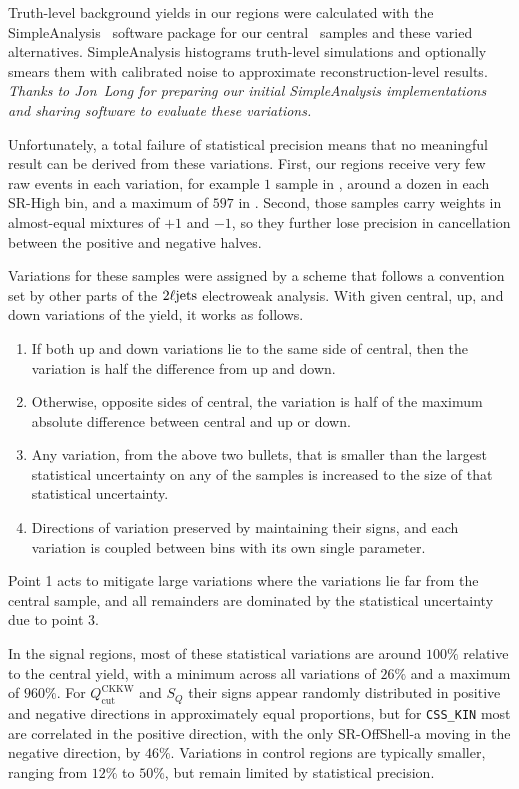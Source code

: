 Truth-level background yields in our regions were calculated with the
SimpleAnalysis~\cite{Lorenz:2752450,simpleanalysis_cern}
software package for
our central \diboson\ samples and these varied alternatives.
SimpleAnalysis histograms truth-level simulations and optionally smears them
with calibrated noise to approximate reconstruction-level results.
\emph{Thanks to Jon~Long for preparing our initial
SimpleAnalysis implementations and sharing software to evaluate these
variations.}

Unfortunately, a total failure of statistical precision means that no
meaningful result can be derived from these variations.
First, our regions receive very few raw events in each variation,
for example $1$ sample in \srllbb, around a dozen in
each SR-High bin, and a maximum of $597$ in \crvz.
Second, those samples carry weights in almost-equal mixtures of $+1$ and $-1$,
so they further lose precision in cancellation between the positive and
negative halves.

Variations for these samples were assigned by a scheme that follows a
convention set by other parts of the $2\ell\mathrm{jets}$ electroweak analysis.
With given central, up, and down variations of the yield, it works as
follows.
\begin{enumerate}
\item If both up and down variations lie to the same side of central, then
the variation is half the difference from up and down.
\item Otherwise, opposite sides of central, the variation is half of the
maximum absolute difference between central and up or down.
\item Any variation, from the above two bullets, that is smaller than the
largest statistical uncertainty on any of the samples is increased to the size
of that statistical uncertainty.
\item Directions of variation preserved by maintaining their signs, and
each variation is coupled between bins with its own single parameter.
\end{enumerate}
Point 1 acts to mitigate large variations where the variations lie far from
the central sample,
and all remainders are dominated by the statistical uncertainty due to point 3.

In the signal regions, most of these statistical variations are around
$100\%$ relative to the central yield, with a minimum across all variations
of $26\%$ and a maximum of $960\%$.
For $Q_\textrm{cut}^\textrm{CKKW}$ and $S_Q$ their signs appear randomly
distributed in positive and negative directions in approximately equal
proportions, but for \texttt{CSS\_KIN} most are correlated in the positive
direction, with the only SR-OffShell-a moving in the negative direction, by
$46\%$.
Variations in control regions are typically smaller, ranging from $12\%$ to
$50\%$, but remain limited by statistical precision.

